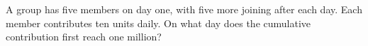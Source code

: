 A group has five members on day one, with five more joining after each day. Each member contributes ten units daily. On what day does the cumulative contribution first reach one million?
